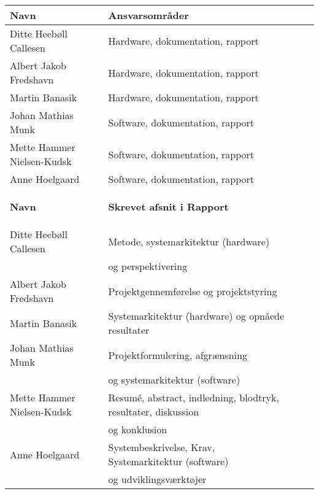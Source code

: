 \begin{longtabu} to 
    \textbf{Navn} &   \textbf{ Ansvarsområder} &    \\[-1ex]
    \midrule
    Ditte Heebøll Callesen &   Hardware, dokumentation, rapport	&    \\
    Albert Jakob Fredshavn &   Hardware, dokumentation, rapport	&    \\
    Martin Banasik         &   Hardware, dokumentation, rapport	&    \\
    Johan Mathias Munk     &   Software, dokumentation, rapport &    \\
    Mette Hammer Nielsen-Kudsk &   Software, dokumentation, rapport &    \\
   	Anne Hoelgaard    &   Software, dokumentation, rapport	&    \\
\label{version_Systemark}

    \textbf{Navn} &    \textbf{Skrevet afsnit i Rapport} &\\[-1ex]
    \midrule
    Ditte Heebøll Callesen & Metode, systemarkitektur (hardware) & \\
     & og perspektivering & \\
    Albert Jakob Fredshavn &  Projektgennemførelse og projektstyring & \\
    Martin Banasik         & Systemarkitektur (hardware) og opnåede resultater & \\
    Johan Mathias Munk     & Projektformulering, afgrænsning &  \\ & og systemarkitektur (software) & \\
    Mette Hammer Nielsen-Kudsk & Resumé, abstract, indledning, blodtryk, resultater, diskussion &  \\
     & og konklusion &  \\
   	Anne Hoelgaard   	 	& Systembeskrivelse, Krav, Systemarkitektur (software) & \\ & og udviklingsværktøjer & \\
\end{longtabu}

